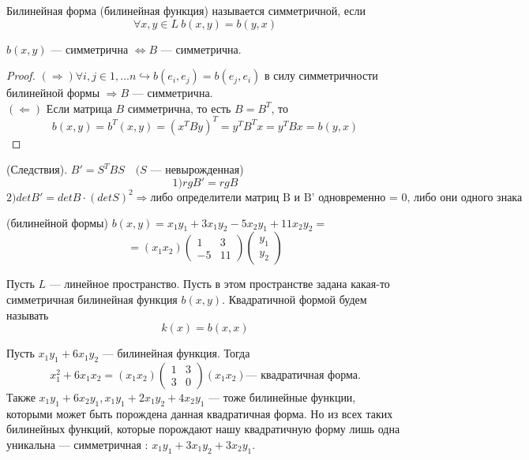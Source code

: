 \documentclass[11pt]{article}
\begin{document}
\begin{definition}
    Билинейная форма (билинейная функция) называется симметричной, если 
    \[ \forall x,y\in L \ b(x,y) = b(y,x) \]
\end{definition}

\begin{statement}
    $b(x,y)$ --- симметрична $\Leftrightarrow B$ --- симметрична. 
\end{statement}

\begin{proof}
   $ (\Rightarrow) \forall i,j \in 1,...n \hookrightarrow b(e_i,e_j)= b(e_j,e_i)$  в силу симметричности билинейной формы $\Rightarrow B$ --- симметрична.\\
   $ (\Leftarrow)$ Если матрица $B$ симметрична, то есть $B=B^T$, то 
   \[ b(x,y) = b^T(x,y) = (x^T By)^T = y^T B^T x = y^T Bx = b(y,x) \]
\end{proof}

\begin{theorem}
    (Следствия). $B'= S^T BS\quad  (S$ --- невырожденная)
    \[ 1) rg B'= rg B \]
    \[ 2) det B' = detB \cdot (detS)^2 \Rightarrow \text{либо определители матриц B и B' одновременно = 0, либо они одного знака} \]
\end{theorem}

\begin{example}
    (билинейной формы) $b(x,y) = x_1y_1 + 3x_1y_2- 5x_2y_1 + 11x_2y_2=$ 
    \[ = (x_1 x_2) \begin{pmatrix}
        1 &3  \\
        -5 & 11
    \end{pmatrix}
    \begin{pmatrix}
        y_1\\
        y_2
    \end{pmatrix}\]
\end{example}

\begin{definition}
    Пусть $L$ --- линейное пространство. Пусть в этом пространстве задана какая-то симметричная билинейная функция $b(x,y)$.
    Квадратичной формой будем называть 
    \[  k(x) = b(x,x) \]
\end{definition}

\begin{example}
    Пусть $ x_1y_1 + 6x_1y_2$ --- билинейная функция. Тогда 
    \[ x_1^2+6x_1x_2 = (x_1 x_2)
    \begin{pmatrix}
    1 & 3\\
    3 & 0
    \end{pmatrix} (x_1x_2) \text{--- квадратичная форма.} \]
    Также $x_1y_1+6x_2y_1, x_1y_1+2x_1y_2+4x_2y_1$ --- тоже билинейные функции, которыми может быть порождена данная квадратичная форма.
    Но из всех таких билинейных функций, которые порождают нашу квадратичную форму лишь одна уникальна --- симметричная : $x_1y_1 + 3x_1y_2 +3x_2y_1$.
\end{example}
\end{document}
